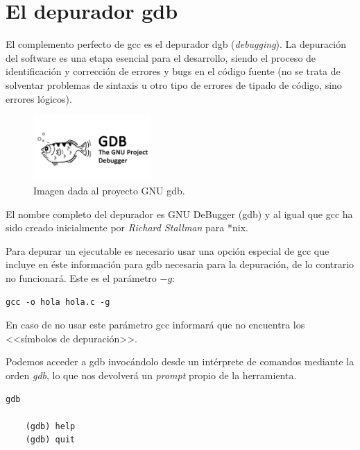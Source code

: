 \documentclass[a4paper, 11pt, titlepage]{article}
\begin{document}
\section{El depurador gdb}

    El complemento perfecto de gcc es el depurador dgb (\textit{debugging}). La depuración 
    del software es una etapa esencial para el desarrollo, siendo el proceso de identificación 
    y corrección de errores y bugs en el código fuente (no se trata de solventar problemas 
    de sintaxis u otro tipo de errores de tipado de código, sino errores lógicos).

    \begin{figure}[htp]
        \centering
        \includegraphics[width=0.4\textwidth]{resources/gnu-gdb.png}
        \caption{Imagen dada al proyecto GNU gdb.}
        \label{gdblogo}
    \end{figure}

    El nombre completo del depurador es GNU DeBugger (gdb) y al igual que gcc ha sido creado
    inicialmente por \textit{Richard Stallman} para *nix.

    Para depurar un ejecutable es necesario usar una opción especial de gcc que incluye en 
    éste información para gdb necesaria para la depuración, de lo contrario no funcionará. 
    Este es el parámetro $-g$:

    \begin{lstlisting}[language=make]
    gcc -o hola hola.c -g\end{lstlisting}

    En caso de no usar este parámetro gcc informará que no encuentra los <<símbolos de 
    depuración>>. 

    Podemos acceder a gdb invocándolo desde un intérprete de comandos mediante la orden 
    \textit{gdb}, lo que nos devolverá un \textit{prompt} propio de la herramienta.

    \begin{lstlisting}[language=make]
    gdb

    (gdb) help
    (gdb) quit\end{lstlisting}

\end{document}
